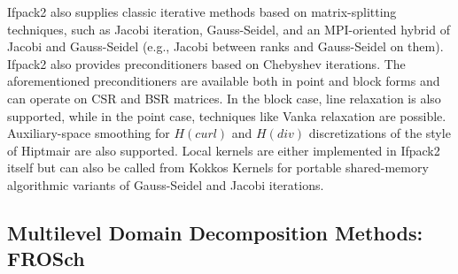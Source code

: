 Ifpack2 also supplies classic iterative methods based on matrix-splitting techniques, such as Jacobi iteration, Gauss-Seidel, and an MPI-oriented hybrid of Jacobi and Gauss-Seidel (e.g., Jacobi between ranks and Gauss-Seidel on them). Ifpack2 also provides preconditioners
based on Chebyshev iterations. The aforementioned preconditioners are available both in point and block
forms and can operate on CSR and BSR matrices. In the block case,
line relaxation is also supported, while in the point case, techniques
like Vanka relaxation \cite{Vanka1986} are possible.  Auxiliary-space
smoothing for $H(curl)$ and $H(div)$ discretizations of the style of
Hiptmair \cite{Hiptmair1997} are also supported.
Local kernels are either implemented in Ifpack2 itself
but can also be called from Kokkos Kernels for portable shared-memory algorithmic variants of Gauss-Seidel and Jacobi iterations.

\subsection{Multilevel Domain Decomposition Methods: FROSch}
\label{ssec:frosch}

